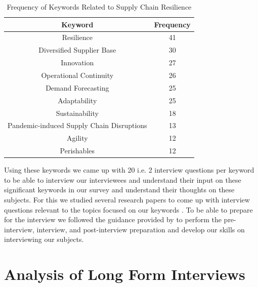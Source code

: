 \begin{table}[h!]
\centering
\begin{tabular}{|c|c|}
\toprule
\textbf{Keyword} & \textbf{Frequency} \\ 
\midrule
Resilience & 41 \\ 
\hline
Diversified Supplier Base & 30 \\
\hline
Innovation & 27 \\
\hline
Operational Continuity & 26 \\
\hline
Demand Forecasting & 25 \\ 
\hline
Adaptability & 25 \\ 
\hline
Sustainability & 18 \\ 
\hline
Pandemic-induced Supply Chain Disruptions & 13 \\ 
\hline
Agility & 12 \\ 
\hline
Perishables & 12 \\ 
\bottomrule
\end{tabular}
\caption{Frequency of Keywords Related to Supply Chain Resilience}
\label{tab:keyword-frequency}
\end{table}

Using these keywords we came up with 20 i.e. 2 interview questions per keyword to be able to interview our interviewees and understand their input on these significant keywords in our survey and understand their thoughts on these subjects. For this we studied several research papers to come up with interview questions relevant to the topics focused on our keywords \parencite{Tukamuhabwa2015SupplyStudy,Ponomarov2009UnderstandingResilience,Wu2007MethodologyAnalysis,Sawik2017AManagement,Chowdhury2021COVID-19Review}. To be able to prepare for the interview we followed the guidance provided by \textcite{Ghauri2020ResearchStudies} to perform the pre-interview, interview, and post-interview preparation and develop our skills on interviewing our subjects.

\section{Analysis of Long Form Interviews}
\label{sec:intervew-analysis}

